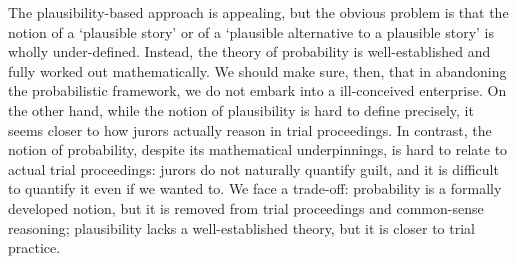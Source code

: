 \documentclass[10pt]{article}
\begin{document}
The plausibility-based approach is appealing, but the obvious problem is that the notion of a `plausible story' or of a `plausible alternative to a plausible story' is wholly under-defined. Instead, the theory of probability is well-established and fully worked out mathematically. We should make sure, then, that in abandoning the probabilistic framework, we do not embark into a ill-conceived enterprise. On the other hand, while the notion of plausibility is hard to define precisely, it seems closer to how jurors actually reason in trial proceedings. In contrast, the notion of probability, despite its 
mathematical underpinnings, is hard to relate to actual trial proceedings: jurors do not naturally quantify guilt, and it is difficult to quantify it even if we wanted to. We face a trade-off: probability is a formally developed notion, but it is 
removed from trial proceedings and common-sense reasoning; plausibility lacks a well-established theory, but it is closer to trial practice. 







%
	

\end{document}

